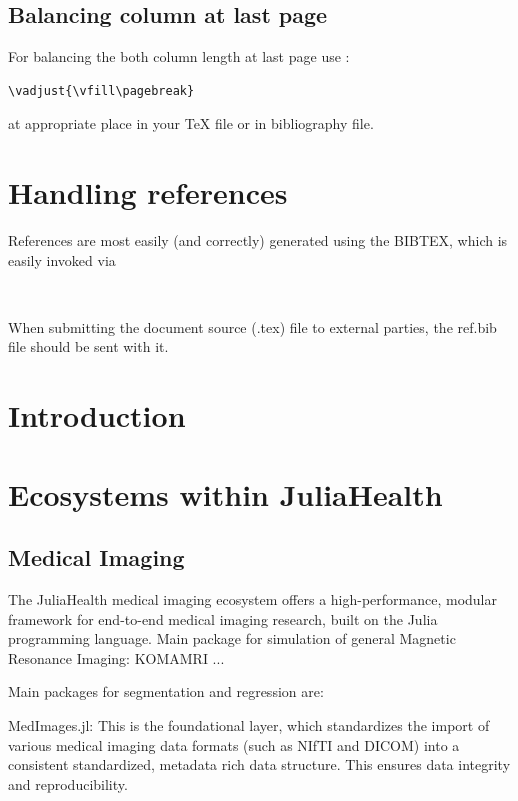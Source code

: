 \documentclass{juliacon}
\begin{document}
\subsection{Balancing column at last page}
\label{subsub:Balance}
For balancing the both column length at last page use :
\begin{verbatim}
\vadjust{\vfill\pagebreak}
\end{verbatim}


at appropriate place in your \TeX{} file or in bibliography file.

\section{Handling references}
\label{subsub:references}
References are most easily (and correctly) generated using the
BIBTEX, which is easily invoked via
\begin{verbatim}


\end{verbatim}
When submitting the document source (.tex) file to external
parties, the ref.bib file should be sent with it.
\cite{bezanson2017julia}



\section{Introduction}

\section{Ecosystems within JuliaHealth}

\subsection{Medical Imaging}
 The JuliaHealth medical imaging ecosystem offers a high-performance, modular framework for end-to-end medical imaging research, built on the Julia programming language. 
Main package for simulation of general Magnetic Resonance Imaging:
KOMAMRI ... 
 
Main packages for segmentation and regression are:

MedImages.jl: This is the foundational layer, which standardizes the import of various medical imaging data formats (such as NIfTI and DICOM) into a consistent standardized, metadata rich data structure. This ensures data integrity and reproducibility.
\end{document}
